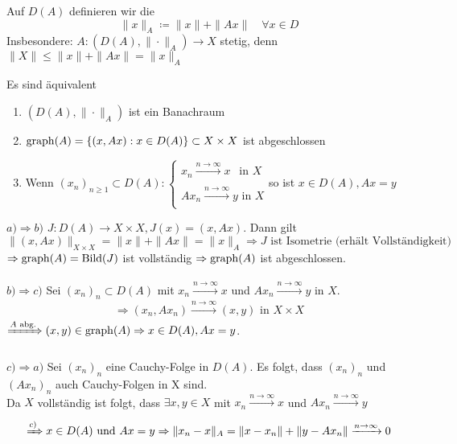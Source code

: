 \begin{definition}
	Auf $D(A)$ definieren wir die 
	\[ \| x \|_{A} \coloneqq \|x \| + \| A x \| \quad \forall x \in D \]
	Insbesondere: $A: (D(A), \| \cdot \|_{A}) \rightarrow X$ stetig, denn $\| X \| \leq \|x \| + \| A x \| = \| x \|_{A}$
\end{definition}


\begin{satz} \label{satz:12.3}
	Es sind äquivalent
	\begin{enumerate}[label=\alph*\upshape)]
		\item $\left( D(A), \| \cdot \|_{A} \right)$ ist ein Banachraum
		\item $\operatorname{graph}(A) = \{ (x, A x): x \in D(A) \} \subset X \times X$ ist abgeschlossen
		\item Wenn $(x_{n})_{n \geq 1} \subset D(A): \begin{cases}
			x_{n} \xrightarrow[]{n \rightarrow \infty} x ~~\text{ in } X \\ A x_{n} \xrightarrow[]{n \rightarrow \infty} y \text{ in } X\end{cases}$so ist $x \in D(A), A x = y$
	\end{enumerate}
\end{satz}

\begin{beweis}
	$a) \Rightarrow b)$ $J: D(A) \rightarrow X \times X, J(x) = (x, Ax)$. Dann gilt
		\[ \| (x, Ax) \|_{X \times X} = \| x \| + \| A x \| = \| x \|_{A} \Rightarrow J \text{ ist Isometrie (erhält Vollständigkeit)}  \]
		$\Rightarrow \operatorname{graph}(A) = \mathop{\rm Bild}\nolimits(J)$ ist vollständig $\Rightarrow \operatorname{graph}(A)$ ist abgeschlossen. \\ \\
	$b) \Rightarrow c)$ Sei $(x_{n})_{n} \subset D(A)$ mit $x_{n} \xrightarrow[]{n \rightarrow \infty} x$ und $Ax_{n} \xrightarrow[]{n \rightarrow \infty} y$ in $X$.
		\[ \Rightarrow (x_{n}, A x_{n}) \xrightarrow[]{n \rightarrow \infty} (x, y) \text{ in } X \times X \]
		$\xRightarrow[]{A \text{ abg.}} (x, y) \in \operatorname{graph}(A) \Rightarrow x \in D(A), Ax = y$. \\ \\
	$c) \Rightarrow a)$ Sei $(x_{n})_{n}$ eine Cauchy-Folge in $D(A)$. Es folgt, dass $(x_{n})_{n}$ und $(A x_{n})_{n}$ auch Cauchy-Folgen in X sind. \\
	Da $X$ vollständig ist folgt, dass  $\exists x, y \in X$ mit $x_{n} \xrightarrow[]{n \rightarrow \infty} x$ und $A x_{n} \xrightarrow[]{n \rightarrow \infty} y$ \\
	\[ \xRightarrow[]{c)} x \in D(A) \text{ und } A x = y \Rightarrow \|x_{n} - x \|_{A} = \| x - x_{n} \| + \| y - A x_{n} \| \xrightarrow[]{n \rightarrow \infty} 0 \]
\end{beweis}


